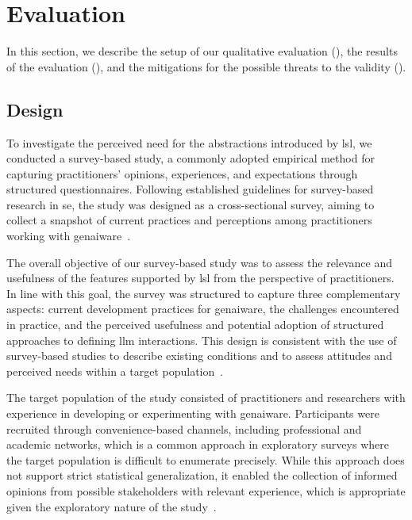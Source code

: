 \documentclass[manuscript,screen]{acmart}
\begin{document}
\section{Evaluation}
\label{sec:evaluation}

In this section, we describe the setup of our qualitative evaluation (), the results of the evaluation (), and the mitigations for the possible threats to the validity ().

\subsection{Design}
\label{sec:design}

To investigate the perceived need for the abstractions introduced by \ac{lsl}, we conducted a survey-based study, a commonly adopted empirical method for capturing practitioners’ opinions, experiences, and expectations through structured questionnaires. 
Following established guidelines for survey-based research in \ac{se}, the study was designed as a cross-sectional survey, aiming to collect a snapshot of current practices and perceptions among practitioners working with \ac{genai}ware~\cite{DBLP:conf/acsos/CalinescuMPW20,DBLP:books/sp/08/KitchenhamP08}.

The overall objective of our survey-based study was to assess the relevance and usefulness of the features supported by \ac{lsl} from the perspective of practitioners. 
In line with this goal, the survey was structured to capture three complementary aspects: current development practices for \ac{genai}ware, the challenges encountered in practice, and the perceived usefulness and potential adoption of structured approaches to defining \ac{llm} interactions. 
This design is consistent with the use of survey-based studies to describe existing conditions and to assess attitudes and perceived needs within a target population~\cite{DBLP:books/sp/08/KitchenhamP08}.

The target population of the study consisted of practitioners and researchers with experience in developing or experimenting with \ac{genai}ware. 
Participants were recruited through convenience-based channels, including professional and academic networks, which is a common approach in exploratory surveys where the target population is difficult to enumerate precisely. 
While this approach does not support strict statistical generalization, it enabled the collection of informed opinions from possible stakeholders with relevant experience, which is appropriate given the exploratory nature of the study~\cite{DBLP:books/sp/08/KitchenhamP08}.
\end{document}
